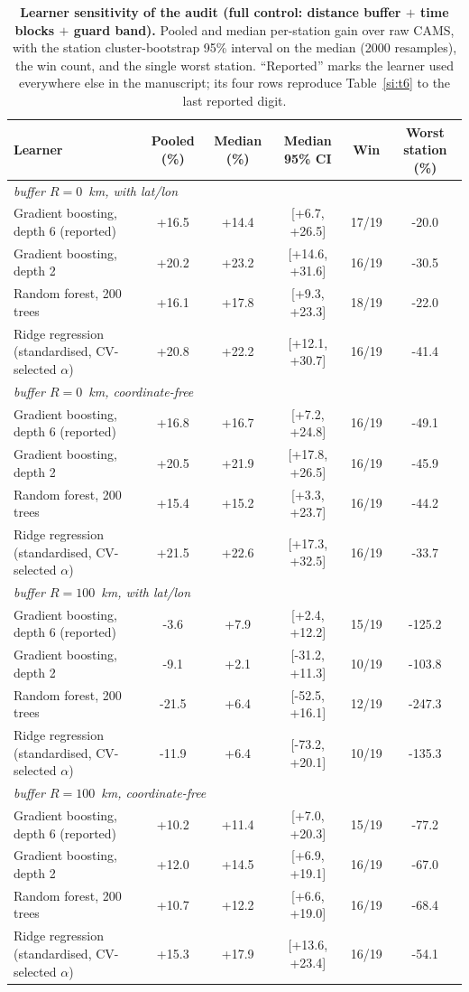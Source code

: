 \documentclass[11pt]{article}
\begin{document}
\begin{table}[htbp]\centering\footnotesize
\caption{\textbf{Learner sensitivity of the audit (full control: distance buffer $+$ time blocks $+$ guard band).} Pooled and median per-station gain over raw CAMS, with the station cluster-bootstrap 95\% interval on the median (2000 resamples), the win count, and the single worst station. ``Reported'' marks the learner used everywhere else in the manuscript; its four rows reproduce Table~\ref{si:t6} to the last reported digit.}
\label{si:t25}
\begin{tabular}{lccccc}\toprule
Learner & Pooled (\%) & Median (\%) & Median 95\% CI & Win & Worst station (\%) \\ \midrule
\multicolumn{6}{l}{\textit{buffer $R=0$~km, with lat/lon}} \\
Gradient boosting, depth 6 (reported) & +16.5 & +14.4 & [+6.7, +26.5] & 17/19 & -20.0 \\
Gradient boosting, depth 2 & +20.2 & +23.2 & [+14.6, +31.6] & 16/19 & -30.5 \\
Random forest, 200 trees & +16.1 & +17.8 & [+9.3, +23.3] & 18/19 & -22.0 \\
Ridge regression (standardised, CV-selected $\alpha$) & +20.8 & +22.2 & [+12.1, +30.7] & 16/19 & -41.4 \\
\multicolumn{6}{l}{\textit{buffer $R=0$~km, coordinate-free}} \\
Gradient boosting, depth 6 (reported) & +16.8 & +16.7 & [+7.2, +24.8] & 16/19 & -49.1 \\
Gradient boosting, depth 2 & +20.5 & +21.9 & [+17.8, +26.5] & 16/19 & -45.9 \\
Random forest, 200 trees & +15.4 & +15.2 & [+3.3, +23.7] & 16/19 & -44.2 \\
Ridge regression (standardised, CV-selected $\alpha$) & +21.5 & +22.6 & [+17.3, +32.5] & 16/19 & -33.7 \\
\multicolumn{6}{l}{\textit{buffer $R=100$~km, with lat/lon}} \\
Gradient boosting, depth 6 (reported) & -3.6 & +7.9 & [+2.4, +12.2] & 15/19 & -125.2 \\
Gradient boosting, depth 2 & -9.1 & +2.1 & [-31.2, +11.3] & 10/19 & -103.8 \\
Random forest, 200 trees & -21.5 & +6.4 & [-52.5, +16.1] & 12/19 & -247.3 \\
Ridge regression (standardised, CV-selected $\alpha$) & -11.9 & +6.4 & [-73.2, +20.1] & 10/19 & -135.3 \\
\multicolumn{6}{l}{\textit{buffer $R=100$~km, coordinate-free}} \\
Gradient boosting, depth 6 (reported) & +10.2 & +11.4 & [+7.0, +20.3] & 15/19 & -77.2 \\
Gradient boosting, depth 2 & +12.0 & +14.5 & [+6.9, +19.1] & 16/19 & -67.0 \\
Random forest, 200 trees & +10.7 & +12.2 & [+6.6, +19.0] & 16/19 & -68.4 \\
Ridge regression (standardised, CV-selected $\alpha$) & +15.3 & +17.9 & [+13.6, +23.4] & 16/19 & -54.1 \\
\bottomrule\end{tabular}\end{table}
\end{document}
